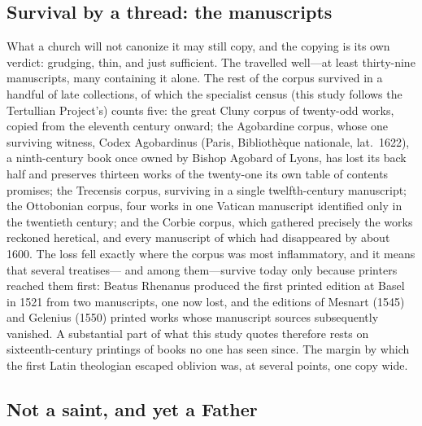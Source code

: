 \subsection{Survival by a thread: the manuscripts}

What a church will not canonize it may still copy, and the copying is its own
verdict: grudging, thin, and just sufficient. The  travelled
well---at least thirty-nine manuscripts, many containing it alone. The rest
of the corpus survived in a handful of late collections, of which the
specialist census (this study follows the Tertullian Project's) counts five:
the great Cluny corpus of twenty-odd works, copied from the eleventh century
onward; the Agobardine corpus, whose one surviving witness, Codex
Agobardinus (Paris, Biblioth\`eque nationale, lat.~1622), a ninth-century
book once owned by Bishop Agobard of Lyons, has lost its back half and
preserves thirteen works of the twenty-one its own table of contents
promises; the Trecensis corpus, surviving in a single twelfth-century
manuscript; the Ottobonian corpus, four works in one Vatican manuscript
identified only in the twentieth century; and the Corbie corpus, which
gathered precisely the works reckoned heretical, and every manuscript of
which had disappeared by about 1600. The loss fell exactly where the corpus
was most inflammatory, and it means that several treatises--- and  among them---survive today only because
printers reached them first: Beatus Rhenanus produced the first printed
edition at Basel in 1521 from two manuscripts, one now lost, and the editions
of Mesnart (1545) and Gelenius (1550) printed works whose manuscript sources
subsequently vanished. A substantial part of what this study quotes therefore rests on
sixteenth-century printings of books no one has seen since. The margin by
which the first Latin theologian escaped oblivion was, at several points, one
copy wide.

\subsection{Not a saint, and yet a Father}

